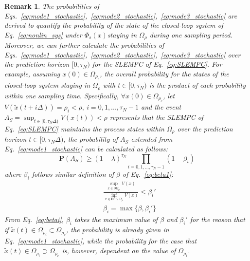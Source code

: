 \documentclass[letterpaper, 10pt, conference]{ieeeconf}
\newtheorem{rmk}{Remark}
\begin{document}
\begin{rmk}\label{rmk2}
The probabilities of Eqs.~\ref{eq:mode1_stochastic},~\ref{eq:mode2_stochastic},~\ref{eq:mode3_stochastic} are derived to quantify the probability of the state of the closed-loop system of Eq.~\ref{eq:nonlin_sys} under $\Phi_s(x)$staying in $\Omega_{\rho}$ during one sampling period. Moreover, we can further calculate the probabilities of Eqs.~\ref{eq:mode1_stochastic},~\ref{eq:mode2_stochastic},~\ref{eq:mode3_stochastic} over the prediction horizon $[0,\tau_{N})$ for the SLEMPC of Eq.~\ref{eq:SLEMPC}. For example, assuming $x(0) \in \Omega_{\rho_e}$, the overall probability for the states of the closed-loop system staying in $\Omega_{\rho}$ with $t \in [0,\tau_{N})$ is the product of each probability within one sampling time. Specifically, $\forall x(0) \in \Omega_{\rho_e}$, let $V(\tilde{x}(t+i \Delta)) =\rho_i < \rho,~ i=0,1,...,\tau_{N}-1$ and the event $A_S = \sup_{t \in [0, \tau_N \Delta)} V(x(t)) < \rho $ represents that the SLEMPC of Eq.~\ref{eq:SLEMPC} maintains the process states within $\Omega_{\rho}$ over the prediction horizon $t \in [0, \tau_N \Delta)$, the probability of $A_S$ extended from Eq.~\ref{eq:mode1_stochastic} can be calculated as follows:
\begin{equation}\label{recursive}
\mathbf{P}(A_S) \geq (1- \lambda)^{\tau_{N}} \prod \limits_{i=0,1,...,\tau_{N}-1} (1-\beta_i)
\end{equation}
where $\beta_i$ follows similar definition of $\beta$ of Eq.~\ref{eq:beta1}:
\begin{subequations}\label{eq:betai}
	\begin{align}
&\frac{\sup_{x \in \partial \Omega_{\rho_i}} V(x)}{\inf_{x \in \mathbf{R}^n \backslash \Omega_{\rho}} V(x)} \leq \beta_i' \\
&\beta_i= \max \{\beta, \beta_i'\}
\end{align}
\end{subequations}
From Eq.~\ref{eq:betai}, $\beta_i$ takes the maximum value of $\beta$ and $\beta_i'$ for the reason that if $\tilde{x}(t) \in \Omega_{\rho_i} \subset \Omega_{\rho_e}$, the probability is already given in Eq.~\ref{eq:mode1_stochastic}, while the probability for the case that $\tilde{x}(t) \in \Omega_{\rho_i} \supset \Omega_{\rho_e}$ is, however, dependent on the value of $\Omega_{\rho_i}$.
\end{rmk}
\end{document}
